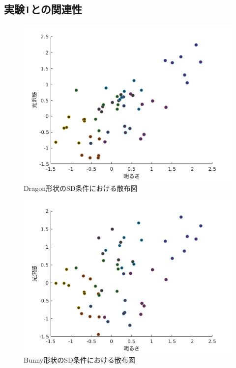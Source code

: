     \newpage
        \subsection{実験1との関連性}

            \begin{figure}[h]
                \centering
                \includegraphics[width=12.0cm]{./img/ex3_DSD.png}
                \caption{Dragon形状のSD条件における散布図}
                \label{ex3_DSD}
            \end{figure}

            \begin{figure}[h]
                \centering
                \includegraphics[width=12.0cm]{./img/ex3_BSD.png}
                \caption{Bunny形状のSD条件における散布図}
                \label{ex3_DSD}
            \end{figure}

